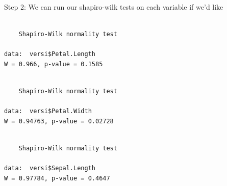 \documentclass[
  letterpaper,
  DIV=11,
  numbers=noendperiod]{scrartcl}
\newenvironment{Shaded}{\begin{snugshade}}{\end{snugshade}}
\newcommand{\CommentTok}[1]{\textcolor[rgb]{0.37,0.37,0.37}{#1}}
\newcommand{\FunctionTok}[1]{\textcolor[rgb]{0.28,0.35,0.67}{#1}}
\newcommand{\NormalTok}[1]{\textcolor[rgb]{0.00,0.23,0.31}{#1}}
\newcommand{\SpecialCharTok}[1]{\textcolor[rgb]{0.37,0.37,0.37}{#1}}
\begin{document}
\hfill\break

Step 2: We can run our shapiro-wilk tests on each variable if we'd like

\begin{Shaded}
\end{Shaded}

\begin{verbatim}

    Shapiro-Wilk normality test

data:  versi$Petal.Length
W = 0.966, p-value = 0.1585
\end{verbatim}

\begin{Shaded}
\end{Shaded}

\begin{verbatim}

    Shapiro-Wilk normality test

data:  versi$Petal.Width
W = 0.94763, p-value = 0.02728
\end{verbatim}

\begin{Shaded}
\end{Shaded}

\begin{verbatim}

    Shapiro-Wilk normality test

data:  versi$Sepal.Length
W = 0.97784, p-value = 0.4647
\end{verbatim}

\begin{Shaded}
\end{Shaded}
\end{document}
